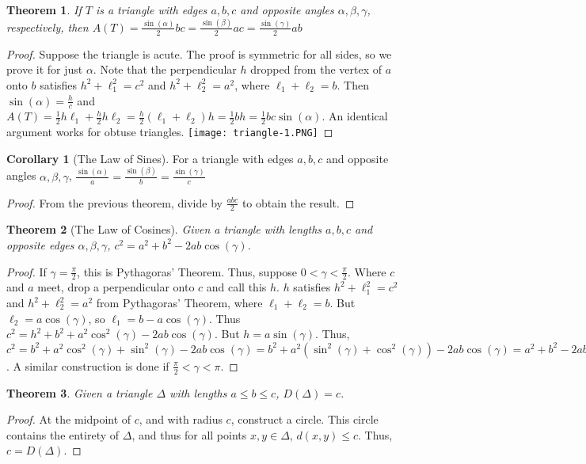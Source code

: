 \documentclass[oneside]{book}
\newtheorem{theorem}{Theorem}[section]
\theoremstyle{definition}
\newtheorem{corollary}{Corollary}[section]
\begin{document}
\begin{theorem}
If $T$ is a triangle with edges $a,b,c$ and opposite angles $\alpha,\beta,\gamma$, respectively, then $A(T) = \frac{\sin(\alpha)}{2}bc = \frac{\sin(\beta)}{2}ac = \frac{\sin(\gamma)}{2}ab$
\end{theorem}
\begin{proof}
Suppose the triangle is acute. The proof is symmetric for all sides, so we prove it for just $\alpha$. Note that the perpendicular $h$ dropped from the vertex of $a$ onto $b$ satisfies $h^2+\ell_1^2 = c^2$ and $h^2+\ell_2^2 = a^2$, where $\ell_1+\ell_2 = b$. Then $\sin(\alpha) = \frac{h}{c}$ and $A(T) = \frac{1}{2}h\ell_1 + \frac{h}{2}h\ell_2 = \frac{h}{2}(\ell_1+\ell_2)h = \frac{1}{2}bh = \frac{1}{2}bc\sin(\alpha)$. An identical argument works for obtuse triangles.
\texttt{[image: triangle-1.PNG]}
\end{proof}

\begin{corollary}[The Law of Sines]
For a triangle with edges $a,b,c$ and opposite angles $\alpha,\beta,\gamma$, $\frac{\sin(\alpha)}{a} = \frac{\sin(\beta)}{b} = \frac{\sin(\gamma)}{c}$
\end{corollary}
\begin{proof}
From the previous theorem, divide by $\frac{abc}{2}$ to obtain the result.
\end{proof}

\begin{theorem}[The Law of Cosines]
Given a triangle with lengths $a,b,c$ and opposite edges $\alpha,\beta,\gamma$, $c^2=a^2+b^2-2ab\cos(\gamma)$.
\end{theorem}
\begin{proof}
If $\gamma=\frac{\pi}{2}$, this is Pythagoras' Theorem. Thus, suppose $0<\gamma < \frac{\pi}{2}$. Where $c$ and $a$ meet, drop a perpendicular onto $c$ and call this $h$. $h$ satisfies $h^2+\ell_1^2 = c^2$ and $h^2+\ell_2^2=a^2$ from Pythagoras' Theorem, where $\ell_1+\ell_2 = b$. But $\ell_2 = a\cos(\gamma)$, so $\ell_1 = b-a\cos(\gamma)$. Thus $c^2 = h^2 + b^2 +a^2\cos^2(\gamma)-2ab\cos(\gamma)$. But $h = a\sin(\gamma)$. Thus, $c^2 = b^2 + a^2 \cos^2(\gamma)+\sin^2(\gamma)-2ab\cos(\gamma) = b^2 + a^2(\sin^2(\gamma)+\cos^2(\gamma))-2ab\cos(\gamma) = a^2 + b^2 -2ab\cos(\gamma)$. A similar construction is done if $\frac{\pi}{2}<\gamma < \pi$.
\end{proof}

\begin{theorem}
Given a triangle $\Delta$ with lengths $a\leq b\leq c$, $D(\Delta)=c$.
\end{theorem}
\begin{proof}
At the midpoint of $c$, and with radius $c$, construct a circle. This circle contains the entirety of $\Delta$, and thus for all points $x,y\in \Delta$, $d(x,y)\leq c$. Thus, $c=D(\Delta)$.
\end{proof}
\end{document}
